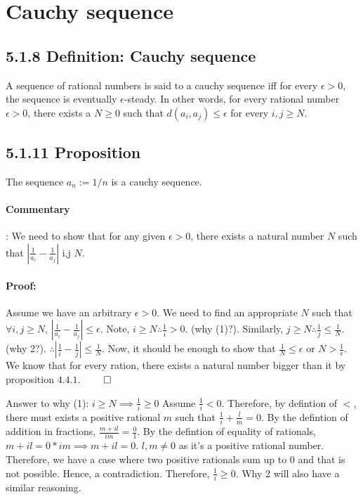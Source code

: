 \documentclass{report}
\begin{document}
\section{Cauchy sequence}
\subsection*{5.1.8 Definition: Cauchy sequence}
A sequence of rational numbers is said to a cauchy sequence iff for every $\epsilon > 0$, 
the sequence is eventually $\epsilon$-steady. In other words, for every rational number $\epsilon > 0$, there exists a  $N \ge 0$ such that  $d(a_i, a_j) \le \epsilon$ for every  $i, j \ge N$.

\subsection*{5.1.11 Proposition} The sequence $a_n := 1/n$ is a cauchy sequence. 
 \paragraph{Commentary}: We need to show that for any given $\epsilon > 0$, there exists a natural number $N$ such that $|\frac{1}{a_i} - \frac{1}{a_j} |$ \le \epsilon \forall i,j \ge $N$.

\paragraph{Proof: }
Assume we have an arbitrary $\epsilon > 0$. We need to find an appropriate  $N$ such that  $\forall i,j \ge N$,  $|\frac{1}{a_i}-\frac{1}{a_j}| \le \epsilon$. Note, $i \ge N \therefore \frac{1}{i} > 0$. (why (1)?). Similarly, $j \ge N \therefore \frac{1}{j} \le \frac{1}{N}$. (why 2?). $\therefore |\frac{1}{i}- \frac{1}{j}| \le \frac{1}{N}$. Now, it should be enough to show that $\frac{1}{N} \le \epsilon$ or $N > \frac{1}{\epsilon}$. We know that for every ration, there exists a natural number bigger than it by proposition $4.4.1$. $\qed$


Answer to why (1): $i \ge N \implies \frac{1}{i} \ge 0$
 Assume $\frac{1}{i} < 0$. Therefore, by defintion of $<$, there must exists a positive rational  $m$ such that  $\frac{1}{i} + \frac{l}{m} = 0$. By the defintion of addition in fractions, $\frac{m+il}{im} = \frac{0}{1}$. By the defintion of equality of rationals, $m+il = 0*im \implies m + il = 0$.  $l, m \ne 0 $ as it's a positive rational number. Therefore, we have a case where two positive rationals sum up to  $0$ and that is not possible. Hence, a contradiction. Therefore,  $\frac{1}{i} \ge 0$. Why 2 will also have a similar reasoning.
\end{document}
